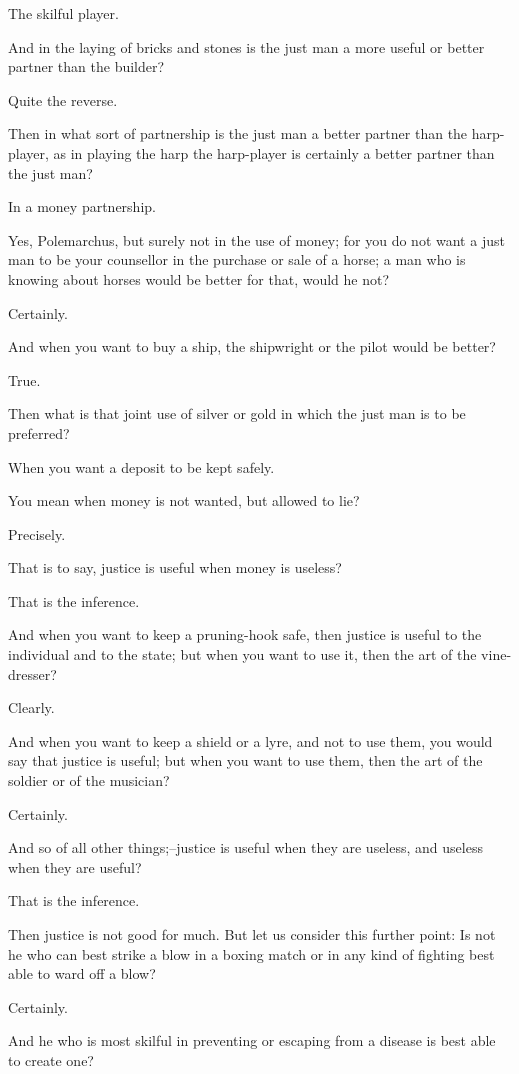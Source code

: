 The skilful player.

And in the laying of bricks and stones is the just man a more useful or
better partner than the builder?

Quite the reverse.

Then in what sort of partnership is the just man a better partner than
the harp-player, as in playing the harp the harp-player is certainly a
better partner than the just man?

In a money partnership.

Yes, Polemarchus, but surely not in the use of money; for you do not
want a just man to be your counsellor in the purchase or sale of a
horse; a man who is knowing about horses would be better for that, would
he not?

Certainly.

And when you want to buy a ship, the shipwright or the pilot would be
better?

True.

Then what is that joint use of silver or gold in which the just man is
to be preferred?

When you want a deposit to be kept safely.

You mean when money is not wanted, but allowed to lie?

Precisely.

That is to say, justice is useful when money is useless?

That is the inference.

And when you want to keep a pruning-hook safe, then justice is useful to
the individual and to the state; but when you want to use it, then the
art of the vine-dresser?

Clearly.

And when you want to keep a shield or a lyre, and not to use them, you
would say that justice is useful; but when you want to use them, then
the art of the soldier or of the musician?

Certainly.

And so of all other things;--justice is useful when they are useless,
and useless when they are useful?

That is the inference.

Then justice is not good for much. But let us consider this further
point: Is not he who can best strike a blow in a boxing match or in any
kind of fighting best able to ward off a blow?

Certainly.

And he who is most skilful in preventing or escaping from a disease is
best able to create one?

